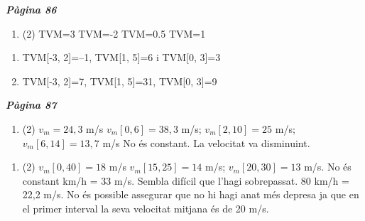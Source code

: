 \documentclass[a4paper, pdf, twoside]{book}
\begin{document}
{\textbf{\em Pàgina 86}} \hrulefill
\begin{enumerate}
\vspace{0.25cm}



 \item[\fontfamily{phv}\selectfont\color{blue}\textbf{1}. ] 
 \begin{tasks}[column-sep=1em, item-indent=1.3333em](2)
	 \task TVM=3
	 \task TVM=-2
	 \task TVM=0.5
	 \task TVM=1
\end{tasks}
 \end{enumerate}
\begin{enumerate}
\vspace{0.25cm}
\item[\fontfamily{phv}\selectfont\color{blue}\textbf{2. }] 
TVM[-3, 2]=--1, TVM[1, 5]=6 i TVM[0, 3]=3
\vspace{0.25cm}
\item[\fontfamily{phv}\selectfont\color{blue}\textbf{3. }] 
TVM[-3, 2]=7, TVM[1, 5]=31, TVM[0, 3]=9
 \end{enumerate}
\vspace{0.3cm}


{\textbf{\em Pàgina 87}} \hrulefill
\begin{enumerate}
\vspace{0.25cm}



 \item[\fontfamily{phv}\selectfont\color{blue}\textbf{4}. ] 
 \begin{tasks}[column-sep=1em, item-indent=1.3333em](2)
	 \task $v_m = 24,3$ m/s
	 \task* $v_m [0,6] = 38,3$ m/s; $v_m[2,10] = 25$ m/s; $v_m[6,14] = 13,7$ m/s
	 \task* No és constant. La velocitat va disminuint. 
\end{tasks}
 \end{enumerate}
\begin{enumerate}
\vspace{0.25cm}



 \item[\fontfamily{phv}\selectfont\color{blue}\textbf{5}. ] 
 \begin{tasks}[column-sep=1em, item-indent=1.3333em](2)
	 \task  $v_m [0,40] = 18$ m/s
	 \task* $v_m [15,25] = 14$ m/s; $v_m [20,30] = 13$ m/s. No és constant
	  km/h = 33 m/s. Sembla difícil que l'hagi sobrepassat. 80 km/h = 22,2 m/s. No és possible assegurar que no hi hagi anat més depresa ja que en el primer interval la seva velocitat mitjana és de 20 m/s.
\end{tasks}
 \end{enumerate}
\vspace{0.3cm}
\end{document}
